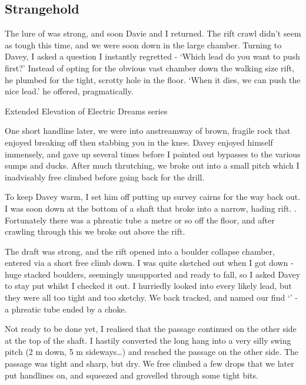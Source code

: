 \subsection{Strangehold}

The lure of  was strong, and soon Davie and I returned. The rift crawl didn't seem as tough this time, and we were soon down in the large chamber. Turning to Davey, I asked a question I instantly regretted - `Which lead do you want to push first?' Instead of opting for the obvious vast chamber down the walking size rift, he plumbed for the tight, scrotty hole in the floor. `When it dies, we can push the nice lead.' he offered, pragmatically.

\begin{survey}[b!]
\checkoddpage \ifoddpage \forcerectofloat \else \forceversofloat \fi
{}
\caption[Extended Elevation of Electric Dreams series]{Extended Elevation of Electric Dreams series}
\end{survey}

One short handline later, we were into anstreamway of brown, fragile rock that enjoyed breaking off then stabbing you in the knee. Davey enjoyed himself immensely, and gave up several times before I pointed out bypasses to the various sumps and ducks. After much thrutching, we broke out into a small pitch which I inadvisably free climbed before going back for the drill.

To keep Davey warm, I set him off putting up survey cairns for the way back out. I was soon down at the bottom of a shaft that broke into a narrow, hading rift. . Fortunately there was a phreatic tube a metre or so off the floor, and after crawling through this we broke out above the rift.

The draft was strong, and the rift opened into a boulder collapse chamber, entered via a short free climb down. I was quite sketched out when I got down - huge stacked boulders, seemingly unsupported and ready to fall, so I asked Davey to stay put whilst I checked it out. I hurriedly looked into every likely lead, but they were all too tight and too sketchy. We back tracked, and named our find `' - a phreatic tube ended by a choke.

Not ready to be done yet, I realised that the passage continued on the other side at the top of the shaft. I hastily converted the long hang into a very silly swing pitch (2 m down, 5 m sideways…)  and reached the passage on the other side. The passage was tight and sharp, but dry. We free climbed a few drops that we later put handlines on, and squeezed and grovelled through some tight bits.


